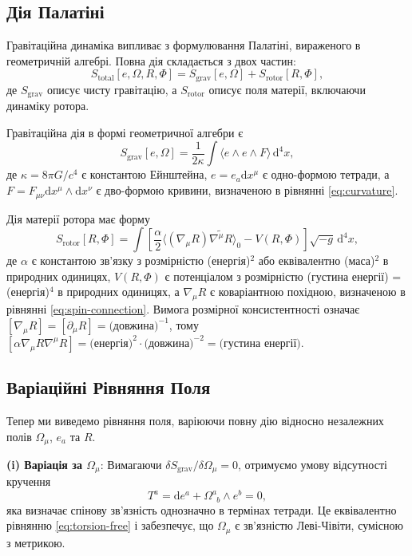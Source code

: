 \documentclass[11pt,a4paper]{article}
\numberwithin{equation}{section}
\theoremstyle{plain}
\theoremstyle{definition}
\theoremstyle{remark}
\newcommand{\dd}{\mathrm{d}}
\begin{document}
\subsection{Дія Палатіні}

Гравітаційна динаміка випливає з формулювання Палатіні, вираженого в геометричній алгебрі. Повна дія складається з двох частин:
\begin{equation}
S_{\mathrm{total}}[e,\Omega,R,\Phi] = S_{\mathrm{grav}}[e,\Omega] + S_{\mathrm{rotor}}[R,\Phi],
\label{eq:action}
\end{equation}
де $S_{\mathrm{grav}}$ описує чисту гравітацію, а $S_{\mathrm{rotor}}$ описує поля матерії, включаючи динаміку ротора.

Гравітаційна дія в формі геометричної алгебри є
\begin{equation}
S_{\mathrm{grav}}[e,\Omega] = \frac{1}{2\kappa} \int \langle e \wedge e \wedge F \rangle \, \dd^4x,
\label{eq:palatini-action}
\end{equation}
де $\kappa = 8\pi G/c^4$ є константою Ейнштейна, $e = e_a \dd x^\mu$ є одно-формою тетради, а $F = F_{\mu\nu} \dd x^\mu \wedge \dd x^\nu$ є дво-формою кривини, визначеною в рівнянні \eqref{eq:curvature}.

Дія матерії ротора має форму
\begin{equation}
S_{\mathrm{rotor}}[R,\Phi] = \int \left[\frac{\alpha}{2}\langle (\nabla_\mu R)\widetilde{\nabla^\mu R} \rangle_0 - V(R,\Phi)\right] \sqrt{-g}\, \dd^4x,
\label{eq:rotor-action}
\end{equation}
де $\alpha$ є константою зв'язку з розмірністю (енергія)$^{2}$ або еквівалентно (маса)$^{2}$ в природних одиницях, $V(R,\Phi)$ є потенціалом з розмірністю (густина енергії) = (енергія)$^{4}$ в природних одиницях, а $\nabla_\mu R$ є коваріантною похідною, визначеною в рівнянні \eqref{eq:spin-connection}. Вимога розмірної консистентності означає $[\nabla_\mu R] = [\partial_\mu R] = \text{(довжина)}^{-1}$, тому $[\alpha \nabla_\mu R \nabla^\mu R] = \text{(енергія)}^2 \cdot \text{(довжина)}^{-2} = \text{(густина енергії)}$.

\subsection{Варіаційні Рівняння Поля}

Тепер ми виведемо рівняння поля, варіюючи повну дію відносно незалежних полів $\Omega_\mu$, $e_a$ та $R$.

\textbf{(i) Варіація за $\Omega_\mu$}: Вимагаючи $\delta S_{\mathrm{grav}}/\delta \Omega_\mu = 0$, отримуємо умову відсутності кручення
\begin{equation}
T^a = \dd e^a + \Omega^a_{\phantom{a}b} \wedge e^b = 0,
\label{eq:field-torsion}
\end{equation}
яка визначає спінову зв'язність однозначно в термінах тетради. Це еквівалентно рівнянню \eqref{eq:torsion-free} і забезпечує, що $\Omega_\mu$ є зв'язністю Леві-Чівіти, сумісною з метрикою.
\end{document}
